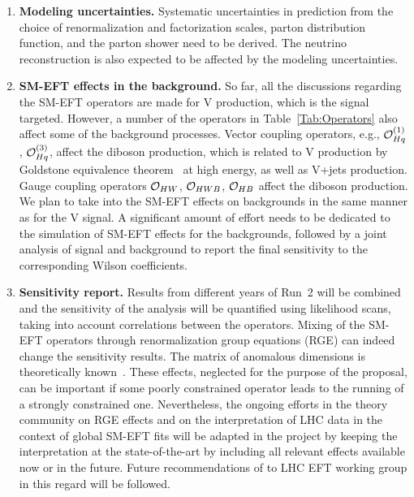 \documentclass[a4paper,11pt]{article}
\newcommand{\Pt}{{{\Pqt}}\xspace}
\newcommand{\PAt}{{{{\Paqt}}}\xspace}
\renewcommand{\PV}{{{{V}}}\xspace}
\newcommand{\VH}{{{\PV}{\PH}}\xspace}
\begin{document}
\begin{enumerate}[noitemsep,topsep=0pt]
\item {\bf Modeling uncertainties.} Systematic uncertainties in prediction from the choice of renormalization and factorization scales,  parton distribution function,  and the parton shower need to be derived. 
The neutrino reconstruction is also expected to be affected by the modeling uncertainties. 

\item {\bf SM-EFT effects in the background.} So far, all the discussions regarding the SM-EFT operators are made for \VH production, which is the signal targeted. However, a number of the operators in Table~\ref{Tab:Operators} also affect some of the background processes. 
Vector coupling operators, e.g., ${\cal O}^{(1)}_{Hq}$, ${\cal O}^{(3)}_{Hq}$, affect the diboson production, which is related to \VH production by Goldstone equivalence theorem~\cite{PhysRevD.10.1145} at high energy, as well as {\PV}+jets production. 
Gauge coupling operators ${\cal O}_{HW}$, ${\cal O}_{HWB}$, ${\cal O}_{HB}$ affect the diboson production.
We plan to take into the SM-EFT effects on backgrounds in the same manner as for the \VH signal.
A significant amount of effort needs to be dedicated to the simulation of SM-EFT effects for the backgrounds, followed by a joint analysis of signal and background to report the final sensitivity to the corresponding Wilson coefficients. 

\item {\bf Sensitivity report.} Results from different years of Run~2 will be combined and
the sensitivity of the analysis will be quantified using likelihood scans, taking into account correlations between the operators. 
Mixing of the SM-EFT operators through renormalization group equations (RGE) can indeed change the sensitivity results. 
The matrix of anomalous dimensions is theoretically known~\cite{Alonso:2013hga,Jenkins:2013wua,Jenkins:2013sda}.
These effects, neglected for the purpose of the proposal, can be important if some poorly constrained operator leads to the running of a strongly constrained one. 
Nevertheless, the ongoing efforts in the theory community on RGE effects and on the interpretation of LHC data in the context of global SM-EFT fits will be adapted in the project by keeping the interpretation at the state-of-the-art by including all relevant effects available now or in the future. Future recommendations of to LHC EFT working group in this regard will be followed.


\end{enumerate}
\end{document}
